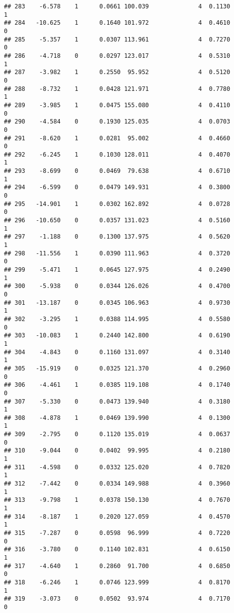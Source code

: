 \documentclass[
]{article}
\begin{document}
\begin{verbatim}
## 283    -6.578    1      0.0661 100.039              4  0.1130      1
## 284   -10.625    1      0.1640 101.972              4  0.4610      0
## 285    -5.357    1      0.0307 113.961              4  0.7270      0
## 286    -4.718    0      0.0297 123.017              4  0.5310      1
## 287    -3.982    1      0.2550  95.952              4  0.5120      0
## 288    -8.732    1      0.0428 121.971              4  0.7780      1
## 289    -3.985    1      0.0475 155.080              4  0.4110      0
## 290    -4.584    0      0.1930 125.035              4  0.0703      0
## 291    -8.620    1      0.0281  95.002              4  0.4660      0
## 292    -6.245    1      0.1030 128.011              4  0.4070      1
## 293    -8.699    0      0.0469  79.638              4  0.6710      1
## 294    -6.599    0      0.0479 149.931              4  0.3800      0
## 295   -14.901    1      0.0302 162.892              4  0.0728      0
## 296   -10.650    0      0.0357 131.023              4  0.5160      1
## 297    -1.188    0      0.1300 137.975              4  0.5620      1
## 298   -11.556    1      0.0390 111.963              4  0.3720      0
## 299    -5.471    1      0.0645 127.975              4  0.2490      1
## 300    -5.938    0      0.0344 126.026              4  0.4700      0
## 301   -13.187    0      0.0345 106.963              4  0.9730      1
## 302    -3.295    1      0.0388 114.995              4  0.5580      0
## 303   -10.083    1      0.2440 142.800              4  0.6190      1
## 304    -4.843    0      0.1160 131.097              4  0.3140      1
## 305   -15.919    0      0.0325 121.370              4  0.2960      0
## 306    -4.461    1      0.0385 119.108              4  0.1740      0
## 307    -5.330    0      0.0473 139.940              4  0.3180      1
## 308    -4.878    1      0.0469 139.990              4  0.1300      1
## 309    -2.795    0      0.1120 135.019              4  0.0637      0
## 310    -9.044    0      0.0402  99.995              4  0.2180      1
## 311    -4.598    0      0.0332 125.020              4  0.7820      1
## 312    -7.442    0      0.0334 149.988              4  0.3960      1
## 313    -9.798    1      0.0378 150.130              4  0.7670      1
## 314    -8.187    1      0.2020 127.059              4  0.4570      1
## 315    -7.287    0      0.0598  96.999              4  0.7220      0
## 316    -3.780    0      0.1140 102.831              4  0.6150      1
## 317    -4.640    1      0.2860  91.700              4  0.6850      0
## 318    -6.246    1      0.0746 123.999              4  0.8170      1
## 319    -3.073    0      0.0502  93.974              4  0.7170      0

\end{verbatim}
\end{document}
